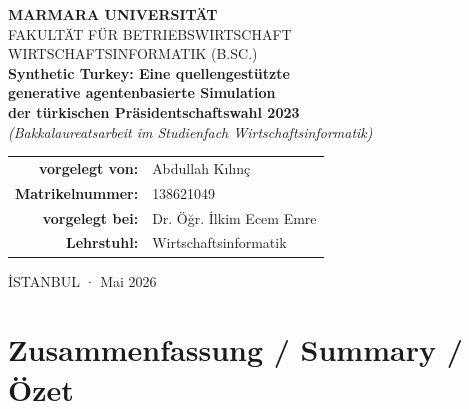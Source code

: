 \documentclass[12pt,a4paper]{report}
\begin{document}

\hypersetup{pageanchor=false}

\begin{titlepage}
\thispagestyle{empty}
\centering
\vspace*{0.5cm}

{\Large\bfseries MARMARA UNIVERSITÄT}\\[0.4cm]
{\large FAKULTÄT FÜR BETRIEBSWIRTSCHAFT}\\[0.4cm]
{\large WIRTSCHAFTSINFORMATIK (B.SC.)}\\[1.6cm]

{\Large\bfseries\color{MarmaraBlue}
Synthetic Turkey: Eine quellengestützte\\[0.2cm]
generative agentenbasierte Simulation\\[0.2cm]
der türkischen Präsidentschaftswahl 2023\\}
\vspace{0.6cm}
{\small\itshape (Bakkalaureatsarbeit im Studienfach Wirtschaftsinformatik)}

\vfill

\begin{tabular}{rl}
\textbf{vorgelegt von:}        & Abdullah Kılınç \\[0.15cm]
\textbf{Matrikelnummer:}       & 138621049 \\[0.15cm]
\textbf{vorgelegt bei:}        & Dr. Öğr. İlkim Ecem Emre \\[0.15cm]
\textbf{Lehrstuhl:}            & Wirtschaftsinformatik \\
\end{tabular}

\vfill
{\large İSTANBUL · Mai 2026}
\end{titlepage}

\hypersetup{pageanchor=true}

\setcounter{page}{1}

\tableofcontents
\clearpage

\chapter*{Zusammenfassung / Summary / Özet}
\end{document}
